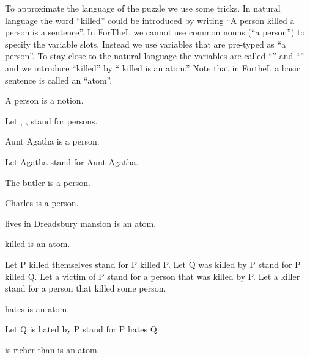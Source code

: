 \documentclass{article}
\begin{document}
To approximate the language of the puzzle we use some tricks.
In natural language the word ``killed'' could be introduced by writing
``A person killed a person is a sentence''. In ForTheL we cannot use
common nouns (``a person'') to specify the variable slots. Instead
we use variables that are pre-typed as ``a person''. To stay close
to the natural language the variables are called ``'' and
``'' and we introduce ``killed'' by
`` killed  is an atom.''
Note that in FortheL a basic sentence is called an ``atom''.

\begin{forthel}
\end{forthel}


\begin{forthel}

\begin{signature}
A person is a notion.
\end{signature}

Let , ,  stand for persons.

\begin{signature}
Aunt Agatha is a person.
\end{signature}

Let Agatha stand for Aunt Agatha.

\begin{signature}
The butler is a person.
\end{signature}

\begin{signature}
Charles is a person.
\end{signature}

\begin{signature}
 lives in Dreadsbury mansion is an atom.
\end{signature}

\begin{signature}
 killed  is an atom.
\end{signature}

Let P killed themselves stand for P killed P.
Let Q was killed by P stand for P killed Q.
Let a victim of P stand for a person that was killed by P.
Let a killer stand for a person that killed some person.

\begin{signature}
 hates  is an atom.
\end{signature}

Let Q is hated by P stand for P hates Q.

\begin{signature}
 is richer than  is an atom.
\end{signature}

\end{forthel}
\end{document}
